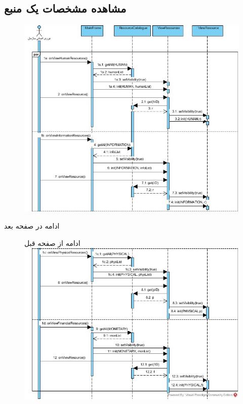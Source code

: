 \begin{landscape}
\section{مشاهده مشخصات یک منبع}
\begin{figure}[H]
	\centering
	\includegraphics[scale=0.8]{img/sequence-design/ViewResourceAttributes-1}
\end{figure}
ادامه در صفحه بعد \\
\begin{figure}[H]
ادامه از صفحه قبل \\
	\includegraphics[scale=0.8]{img/sequence-design/ViewResourceAttributes-2}

\end{figure}
\end{landscape}
